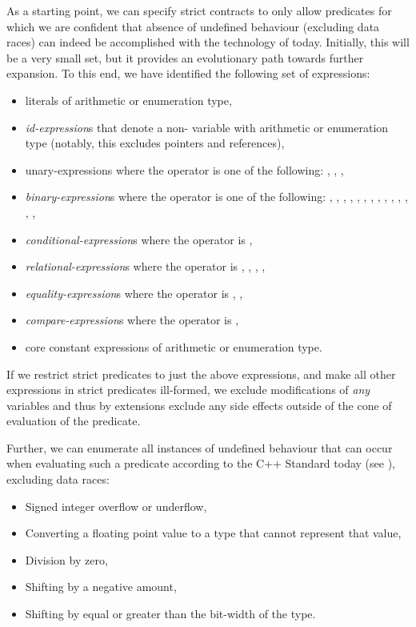 As a starting point, we can specify strict contracts to only allow predicates for which we are confident that absence of undefined behaviour (excluding data races) can indeed be accomplished with the technology of today. Initially, this will be a very small set, but it provides an evolutionary path towards further expansion. To this end, we have identified the following set of expressions:
\begin{itemize}
\item literals of arithmetic or enumeration type,
\item \emph{id-expression}s that denote a non- variable with arithmetic or enumeration type (notably, this excludes pointers and references),
\item unary-expressions where the operator is one of the following: \tcode{+}, \tcode{-}, \tcode{!}, \tcode{~}
\item \emph{binary-expression}s where the operator is one of the following: \tcode{+}, \tcode{-}, \tcode{/}, \tcode{\%}, \tcode{*}, \tcode{!}, \tcode{~}, \tcode{\^}, \tcode{|}, \tcode{||}, \tcode{\&}, \tcode{\&\&}, \tcode{<<}, \tcode{>>},
\item \emph{conditional-expression}s where the operator is ,
\item \emph{relational-expression}s where the operator is \tcode{<}, \tcode{>}, \tcode{<=}, \tcode{>=},
\item \emph{equality-expression}s where the operator is \tcode{==}, \tcode{!=},
\item \emph{compare-expression}s where the operator is \tcode{<=>},
\item core constant expressions of arithmetic or enumeration type.
\end{itemize}
If we restrict strict predicates to just the above expressions, and make all other expressions in strict predicates ill-formed, we exclude modifications of \emph{any} variables and thus by extensions exclude any side effects outside of the cone of evaluation of the predicate.

Further, we can enumerate all instances of undefined behaviour that can occur when evaluating such a predicate according to the C++ Standard today (see \cite{P1705R1}), excluding data races:
\begin{itemize}
\item Signed integer overflow or underflow,
\item Converting a floating point value to a type that cannot represent that value,
\item Division by zero,
\item Shifting by a negative amount,
\item Shifting by equal or greater than the bit-width of the type.
\end{itemize}

